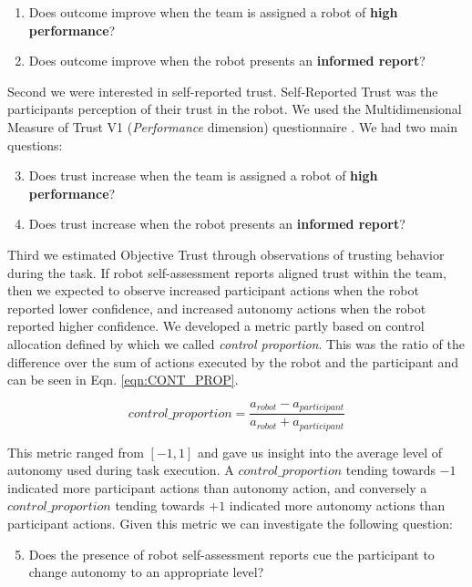 \documentclass[aaai]{article}
\begin{document}
\begin{enumerate}
\item Does outcome improve when the team is assigned a robot of \textbf{high performance}?
\item Does outcome improve when the robot presents an \textbf{informed report}?
\end{enumerate}

Second we were interested in self-reported trust. Self-Reported Trust was the participants perception of their trust in the robot. We used the Multidimensional Measure of Trust V1 (\textit{Performance} dimension) questionnaire \cite{mdmt_ullman}. We had two main questions:


\begin{enumerate}
\setcounter{enumi}{2}
\item Does trust increase when the team is assigned a robot of \textbf{high performance}?
\item Does trust increase when the robot presents an \textbf{informed report}?
\end{enumerate}

Third we estimated Objective Trust through observations of trusting behavior during the task. If robot self-assessment reports aligned trust within the team, then we expected to observe increased participant actions when the robot reported lower confidence, and increased autonomy actions when the robot reported higher confidence. We developed a metric partly based on control allocation defined by \cite{team_performance} which we called \textit{control proportion}. This was the ratio of the difference over the sum of actions executed by the robot and the participant and can be seen in Eqn. \ref{eqn:CONT_PROP}.

\begin{equation}
control\_proportion = \frac{a_{robot} - a_{participant}}{a_{robot}+a_{participant}}
\label{eqn:CONT_PROP}
\end{equation}

This metric ranged from $[-1,1]$ and gave us insight into the average level of autonomy used during task execution. A $control\_proportion$ tending towards $-1$ indicated more participant actions than autonomy action, and conversely a $control\_proportion$ tending towards $+1$ indicated more autonomy actions than participant actions. Given this metric we can investigate the following question:

\begin{enumerate}
\setcounter{enumi}{4}
\item Does the presence of robot self-assessment reports cue the participant to change autonomy to an appropriate level?
\end{enumerate}
\end{document}
